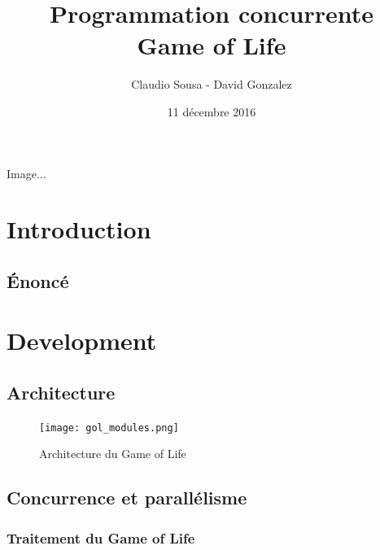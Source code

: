 \documentclass[11pt, a4paper]{article}
\begin{document}
\title
{
    \Huge{Programmation concurrente} \\
    \Huge{Game of Life}
}
\author
{
    \LARGE{Claudio Sousa - David Gonzalez}
}
\date{11 décembre 2016}
\maketitle

\begin{center}
    Image...%
\end{center}

\thispagestyle{empty}

\newpage

\section{Introduction}
\subsection{Énoncé}

\newpage

\section{Development}
\subsection{Architecture}

\begin{figure}[H]
    \begin{center}
        \texttt{[image: gol\_modules.png]}
    \end{center}
    \caption{Architecture du Game of Life}
    \label{Architecture du Game of Life}
\end{figure}

\newpage

\subsection{Concurrence et parallélisme}
\subsubsection{Traitement du Game of Life}
\end{document}
